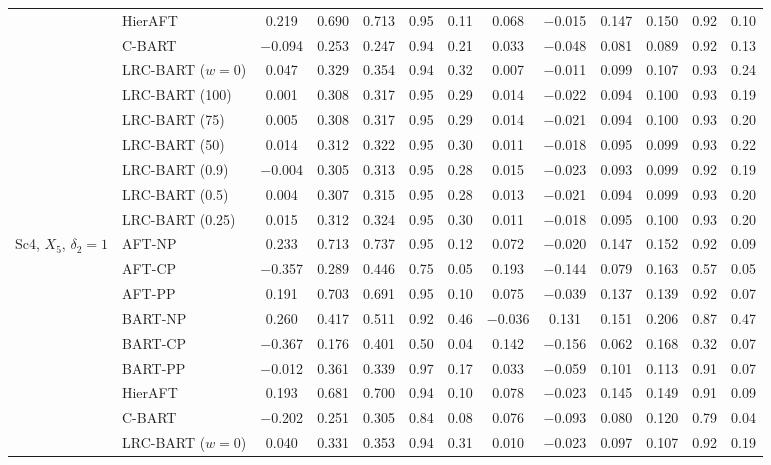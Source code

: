 \begin{center}
\begin{longtable}{llccccccccccc}
& HierAFT & 0.219 & 0.690 & 0.713 & 0.95 & 0.11 & 0.068 & $-$0.015 & 0.147 & 0.150 & 0.92 & 0.10 \\
& C-BART & $-$0.094 & 0.253 & 0.247 & 0.94 & 0.21 & 0.033 & $-$0.048 & 0.081 & 0.089 & 0.92 & 0.13 \\
& LRC-BART ($w=0$) & 0.047 & 0.329 & 0.354 & 0.94 & 0.32 & 0.007 & $-$0.011 & 0.099 & 0.107 & 0.93 & 0.24 \\
& LRC-BART (100) & 0.001 & 0.308 & 0.317 & 0.95 & 0.29 & 0.014 & $-$0.022 & 0.094 & 0.100 & 0.93 & 0.19 \\
& LRC-BART (75) & 0.005 & 0.308 & 0.317 & 0.95 & 0.29 & 0.014 & $-$0.021 & 0.094 & 0.100 & 0.93 & 0.20 \\
& LRC-BART (50) & 0.014 & 0.312 & 0.322 & 0.95 & 0.30 & 0.011 & $-$0.018 & 0.095 & 0.099 & 0.93 & 0.22 \\
& LRC-BART (0.9) & $-$0.004 & 0.305 & 0.313 & 0.95 & 0.28 & 0.015 & $-$0.023 & 0.093 & 0.099 & 0.92 & 0.19 \\
& LRC-BART (0.5) & 0.004 & 0.307 & 0.315 & 0.95 & 0.28 & 0.013 & $-$0.021 & 0.094 & 0.099 & 0.93 & 0.20 \\
& LRC-BART (0.25) & 0.015 & 0.312 & 0.324 & 0.95 & 0.30 & 0.011 & $-$0.018 & 0.095 & 0.100 & 0.93 & 0.20 \\
\midrule
\multirow{15}{*}{Sc4, $X_5$, $\delta_2=1$} & AFT-NP & 0.233 & 0.713 & 0.737 & 0.95 & 0.12 & 0.072 & $-$0.020 & 0.147 & 0.152 & 0.92 & 0.09 \\
& AFT-CP & $-$0.357 & 0.289 & 0.446 & 0.75 & 0.05 & 0.193 & $-$0.144 & 0.079 & 0.163 & 0.57 & 0.05 \\
& AFT-PP & 0.191 & 0.703 & 0.691 & 0.95 & 0.10 & 0.075 & $-$0.039 & 0.137 & 0.139 & 0.92 & 0.07 \\
& BART-NP & 0.260 & 0.417 & 0.511 & 0.92 & 0.46 & $-$0.036 & 0.131 & 0.151 & 0.206 & 0.87 & 0.47 \\
& BART-CP & $-$0.367 & 0.176 & 0.401 & 0.50 & 0.04 & 0.142 & $-$0.156 & 0.062 & 0.168 & 0.32 & 0.07 \\
& BART-PP & $-$0.012 & 0.361 & 0.339 & 0.97 & 0.17 & 0.033 & $-$0.059 & 0.101 & 0.113 & 0.91 & 0.07 \\
& HierAFT & 0.193 & 0.681 & 0.700 & 0.94 & 0.10 & 0.078 & $-$0.023 & 0.145 & 0.149 & 0.91 & 0.09 \\
& C-BART & $-$0.202 & 0.251 & 0.305 & 0.84 & 0.08 & 0.076 & $-$0.093 & 0.080 & 0.120 & 0.79 & 0.04 \\
& LRC-BART ($w=0$) & 0.040 & 0.331 & 0.353 & 0.94 & 0.31 & 0.010 & $-$0.023 & 0.097 & 0.107 & 0.92 & 0.19 \\

\end{longtable}
\end{center}
